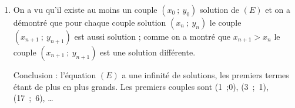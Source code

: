 \documentclass[10pt]{article}
\newcommand{\N}{\textbf{N}}
\begin{document}
\begin{enumerate}
\begin{enumerate}
Alors $\begin{pmatrix}x_{n+1}\\y_{n+1}\end{pmatrix} = A\begin{pmatrix}x_{n}\\y_{n}\end{pmatrix} =  \begin{pmatrix}3&8\\1&3\end{pmatrix}\begin{pmatrix}x_{n}\\y_{n}\end{pmatrix} = \begin{pmatrix}3x_{n} + 8y_n\\x_n + 3y_{n}\end{pmatrix}$

Donc $x_{n+1} = 3x_n + 8y_n$ et $y_{n+1} = x_n + 3y_n$.

Calculons la différence :

$x_{n+1}^2 - 8y_{n+1}^2 = \left(3x_n + 8y_n\right)^2 -  8\left(x_n + 3y_n \right)^2 = 9x_n^2 64y_n^2 + 48x_ny_n - 8\left(x_n^2 + 9y_n^2 + 6x_ny_n \right) = 9x_n^2 +  64y_n^2 + 48x_ny_n - 8x_n^2 - 72y_n^2 - 48x_ny_n = x_n - 8y_n^2 = 1$, d'après l'hypothèse de récurrence.

Le couple $\left(x_{n+1}~;~y_{n+1} \right)$ est aussi un couple solution.

On a montré que la proposition est vraie au rang $0$ et que si elle est vraie à un rang $n \in \N$ elle l'est aussi au rang $n + 1$ : d'après le principe de récurrence on a montré que pour tout naturel $n$, \: le couple $\left(x_n~;~y_n \right)$ est une solution de $(E)$.
		\item %
		
On calcule la différence :

$x_{n+1} - x_n = 3x_n + 8y_n - x_n = 2x_n + 8y_n$ ; cette somme est positive car on suppose que $x_n > 0$ et  $y_n \in \N,\: y_n \geqslant 0$.

On a donc $x_{n+1} - x_n > 0 \iff x_{n+1} > x_n$ : la suite $\left(x_n\right)$ est donc strictement croissante.


 	\end{enumerate}
\item  %
On a vu qu'il existe au moins un couple $\left(x_0~;~y_0\right)$ solution de $(E)$ et on a démontré que pour chaque couple solution $\left(x_n~;~y_n\right)$ le couple $\left(x_{n+1}~;~y_{n+1}\right)$ est aussi solution ; comme on a montré que $x_{n+1} > x_n$ le couple  $\left(x_{n+1}~;~y_{n+1}\right)$ est une solution différente.

Conclusion : l'équation $(E)$ a une infinité de solutions, les premiers termes étant de plus en plus grands. Les premiers couples sont (1~;0), \: (3~;~1), \: (17~;~6), \ldots
\end{enumerate}
\end{document}

